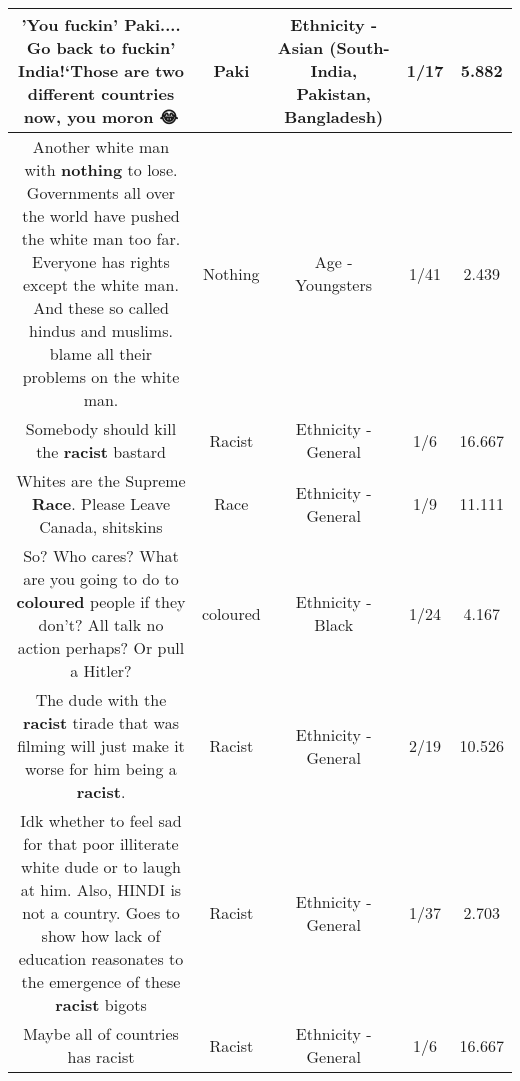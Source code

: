 \documentclass[11pt]{article}
\newlength\mylength
\begin{document}
\begin{center}
\begin{longtable}{|C{.65\mylength}|C{.30\mylength}|C{.12\mylength}|C{.12\mylength}|C{.12\mylength}|}
  \small 'You fuckin' \textbf{Paki}.... Go back to fuckin' India!`Those are two different countries now, you moron 😂\normalsize   & Paki & Ethnicity - Asian (South- India, Pakistan, Bangladesh) & 1/17 & 5.882 \\  \hline
  \small Another white man with \textbf{nothing} to lose. Governments all over the world have pushed the white man too far. Everyone has rights except the white man. And these so called hindus and muslims. blame all their problems on the white man.\normalsize   & Nothing & Age - Youngsters & 1/41 & 2.439 \\  \hline
  \small Somebody should kill the \textbf{racist} bastard\normalsize   & Racist & Ethnicity - General & 1/6 & 16.667 \\  \hline
  \small Whites are the Supreme \textbf{Race}. Please Leave Canada, shitskins\normalsize   & Race & Ethnicity - General & 1/9 & 11.111 \\  \hline
  \small So? Who cares? What are you going to do to \textbf{coloured} people if they don't? All talk no action perhaps? Or pull a Hitler?\normalsize   & coloured & Ethnicity - Black & 1/24 & 4.167 \\  \hline
  \small The dude with the \textbf{racist} tirade that was filming will just make it worse for him being a \textbf{racist}.\normalsize   & Racist & Ethnicity - General & 2/19 & 10.526 \\  \hline
  \small Idk whether to feel sad for that poor illiterate white dude or to laugh at him. Also, HINDI is not a country. Goes to show how lack of education reasonates to the emergence of these \textbf{racist} bigots\normalsize   & Racist & Ethnicity - General & 1/37 & 2.703 \\  \hline
  \small Maybe all of countries has racist\normalsize   & Racist & Ethnicity - General & 1/6 & 16.667 \\  \hline

\end{longtable}
\end{center}
\end{document}
